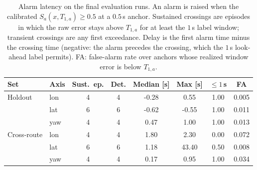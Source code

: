 \begin{table}[!t]
\caption{Alarm latency on the final evaluation runs. An alarm is raised when the calibrated $S_a(x,T_{1,a}) \ge 0.5$ at a $0.5$\,s anchor. Sustained crossings are episodes in which the raw error stays above $T_{1,a}$ for at least the $1$\,s label window; transient crossings are any first exceedance. Delay is the first alarm time minus the crossing time (negative: the alarm precedes the crossing, which the $1$\,s look-ahead label permits). FA: false-alarm rate over anchors whose realized window error is below $T_{1,a}$.}
\label{tab:delay}
\centering
\footnotesize
\setlength{\tabcolsep}{2.4pt}
\begin{tabular}{llcccccc}
\toprule
Set & Axis & Sust.\ ep. & Det. & Median [s] & Max [s] & $\le 1$\,s & FA \\
\midrule
Holdout & lon & 4 & 4 & -0.28 & 0.55 & 1.00 & 0.005 \\
 & lat & 6 & 6 & -0.62 & -0.55 & 1.00 & 0.011 \\
 & yaw & 4 & 4 & 0.47 & 1.00 & 1.00 & 0.013 \\
\midrule
Cross-route & lon & 4 & 4 & 1.80 & 2.30 & 0.00 & 0.072 \\
 & lat & 6 & 6 & 1.18 & 43.40 & 0.50 & 0.008 \\
 & yaw & 4 & 4 & 0.17 & 0.95 & 1.00 & 0.034 \\
\bottomrule
\end{tabular}
\end{table}
